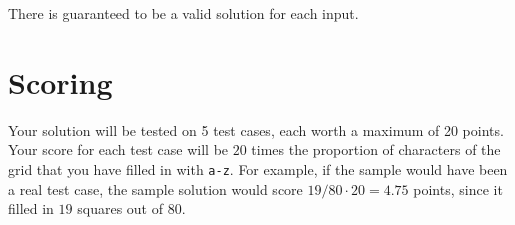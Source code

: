 There is guaranteed to be a valid solution for each input.

\section*{Scoring}
Your solution will be tested on 5 test cases, each worth a maximum of 20 points.
Your score for each test case will be $20$ times the proportion of characters
of the grid that you have filled in with \texttt{a-z}.
For example, if the sample would have been a real test case, the sample solution
would score $19 / 80 \cdot 20 = 4.75$ points, since it filled in $19$ squares out of $80$.
